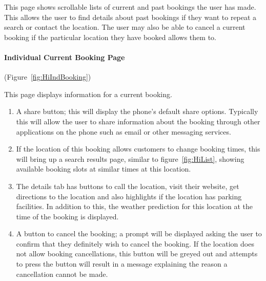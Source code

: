 
This page shows scrollable lists of current and past bookings the user has
made. This allows the user to find details about past bookings if they want to
repeat a search or contact the location. The user may also be able to cancel a
current booking if the particular location they have booked allows them to.

\paragraph{Individual Current Booking Page} (Figure~\ref{fig:HiIndBooking})


This page displays information for a current booking.
\begin{enumerate}
	\item A share button; this will display the phone's default share options.
		Typically this will allow the user to share information about the
		booking through other applications on the phone such as email or other
		messaging services.
	\item If the location of this booking allows customers to change booking
		times, this will bring up a search results page, similar to
		figure~\ref{fig:HiList}, showing available booking slots at similar
		times at this location.
	\item The details tab has buttons to call the location, visit their
		website, get directions to the location and also highlights if the
		location has parking facilities. In addition to this, the weather
		prediction for this location at the time of the booking is displayed.
	\item A button to cancel the booking; a prompt will be displayed asking
		the user to confirm that they definitely wish to cancel the booking.
		If the location does not allow booking cancellations, this button will
		be greyed out and attempts to press the button will result in a message
		explaining the reason a cancellation cannot be made.
\end{enumerate}

